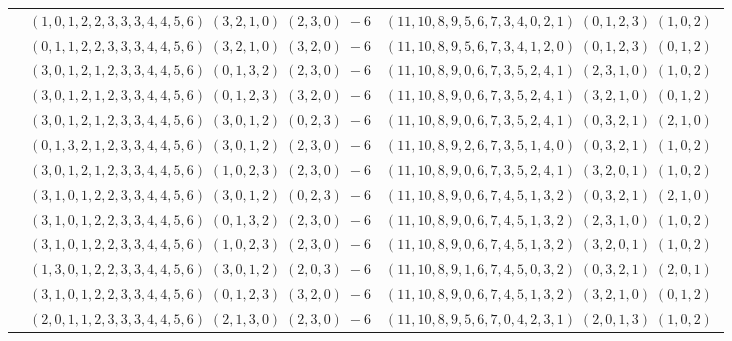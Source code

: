 \documentclass[11pt]{article}
\begin{document}
\begin{longtable}[l]{|c|c|c|}
 \cline{2-3} 
 & $(1 ,0 ,1 ,2 ,2 ,3 ,3 ,3 ,4 ,4 ,5 ,6) \;(3 ,2 ,1 ,0) \;(2 ,3 ,0) \;-6$ & $(11 ,10 ,8 ,9 ,5 ,6 ,7 ,3 ,4 ,0 ,2 ,1) \;(0 ,1 ,2 ,3) \;(1 ,0 ,2) \;$\\ 
 \cline{2-3} 
 & $(0 ,1 ,1 ,2 ,2 ,3 ,3 ,3 ,4 ,4 ,5 ,6) \;(3 ,2 ,1 ,0) \;(3 ,2 ,0) \;-6$ & $(11 ,10 ,8 ,9 ,5 ,6 ,7 ,3 ,4 ,1 ,2 ,0) \;(0 ,1 ,2 ,3) \;(0 ,1 ,2) \;$\\ 
 \cline{2-3} 
 & $(3 ,0 ,1 ,2 ,1 ,2 ,3 ,3 ,4 ,4 ,5 ,6) \;(0 ,1 ,3 ,2) \;(2 ,3 ,0) \;-6$ & $(11 ,10 ,8 ,9 ,0 ,6 ,7 ,3 ,5 ,2 ,4 ,1) \;(2 ,3 ,1 ,0) \;(1 ,0 ,2) \;$\\ 
 \cline{2-3} 
 & $(3 ,0 ,1 ,2 ,1 ,2 ,3 ,3 ,4 ,4 ,5 ,6) \;(0 ,1 ,2 ,3) \;(3 ,2 ,0) \;-6$ & $(11 ,10 ,8 ,9 ,0 ,6 ,7 ,3 ,5 ,2 ,4 ,1) \;(3 ,2 ,1 ,0) \;(0 ,1 ,2) \;$\\ 
 \cline{2-3} 
 & $(3 ,0 ,1 ,2 ,1 ,2 ,3 ,3 ,4 ,4 ,5 ,6) \;(3 ,0 ,1 ,2) \;(0 ,2 ,3) \;-6$ & $(11 ,10 ,8 ,9 ,0 ,6 ,7 ,3 ,5 ,2 ,4 ,1) \;(0 ,3 ,2 ,1) \;(2 ,1 ,0) \;$\\ 
 \cline{2-3} 
 & $(0 ,1 ,3 ,2 ,1 ,2 ,3 ,3 ,4 ,4 ,5 ,6) \;(3 ,0 ,1 ,2) \;(2 ,3 ,0) \;-6$ & $(11 ,10 ,8 ,9 ,2 ,6 ,7 ,3 ,5 ,1 ,4 ,0) \;(0 ,3 ,2 ,1) \;(1 ,0 ,2) \;$\\ 
 \cline{2-3} 
 & $(3 ,0 ,1 ,2 ,1 ,2 ,3 ,3 ,4 ,4 ,5 ,6) \;(1 ,0 ,2 ,3) \;(2 ,3 ,0) \;-6$ & $(11 ,10 ,8 ,9 ,0 ,6 ,7 ,3 ,5 ,2 ,4 ,1) \;(3 ,2 ,0 ,1) \;(1 ,0 ,2) \;$\\ 
 \cline{2-3} 
 & $(3 ,1 ,0 ,1 ,2 ,2 ,3 ,3 ,4 ,4 ,5 ,6) \;(3 ,0 ,1 ,2) \;(0 ,2 ,3) \;-6$ & $(11 ,10 ,8 ,9 ,0 ,6 ,7 ,4 ,5 ,1 ,3 ,2) \;(0 ,3 ,2 ,1) \;(2 ,1 ,0) \;$\\ 
 \cline{2-3} 
 & $(3 ,1 ,0 ,1 ,2 ,2 ,3 ,3 ,4 ,4 ,5 ,6) \;(0 ,1 ,3 ,2) \;(2 ,3 ,0) \;-6$ & $(11 ,10 ,8 ,9 ,0 ,6 ,7 ,4 ,5 ,1 ,3 ,2) \;(2 ,3 ,1 ,0) \;(1 ,0 ,2) \;$\\ 
 \cline{2-3} 
 & $(3 ,1 ,0 ,1 ,2 ,2 ,3 ,3 ,4 ,4 ,5 ,6) \;(1 ,0 ,2 ,3) \;(2 ,3 ,0) \;-6$ & $(11 ,10 ,8 ,9 ,0 ,6 ,7 ,4 ,5 ,1 ,3 ,2) \;(3 ,2 ,0 ,1) \;(1 ,0 ,2) \;$\\ 
 \cline{2-3} 
 & $(1 ,3 ,0 ,1 ,2 ,2 ,3 ,3 ,4 ,4 ,5 ,6) \;(3 ,0 ,1 ,2) \;(2 ,0 ,3) \;-6$ & $(11 ,10 ,8 ,9 ,1 ,6 ,7 ,4 ,5 ,0 ,3 ,2) \;(0 ,3 ,2 ,1) \;(2 ,0 ,1) \;$\\ 
 \cline{2-3} 
 & $(3 ,1 ,0 ,1 ,2 ,2 ,3 ,3 ,4 ,4 ,5 ,6) \;(0 ,1 ,2 ,3) \;(3 ,2 ,0) \;-6$ & $(11 ,10 ,8 ,9 ,0 ,6 ,7 ,4 ,5 ,1 ,3 ,2) \;(3 ,2 ,1 ,0) \;(0 ,1 ,2) \;$\\ 
 \cline{2-3} 
 & $(2 ,0 ,1 ,1 ,2 ,3 ,3 ,3 ,4 ,4 ,5 ,6) \;(2 ,1 ,3 ,0) \;(2 ,3 ,0) \;-6$ & $(11 ,10 ,8 ,9 ,5 ,6 ,7 ,0 ,4 ,2 ,3 ,1) \;(2 ,0 ,1 ,3) \;(1 ,0 ,2) \;$\\ 

\end{longtable}
\end{document}
